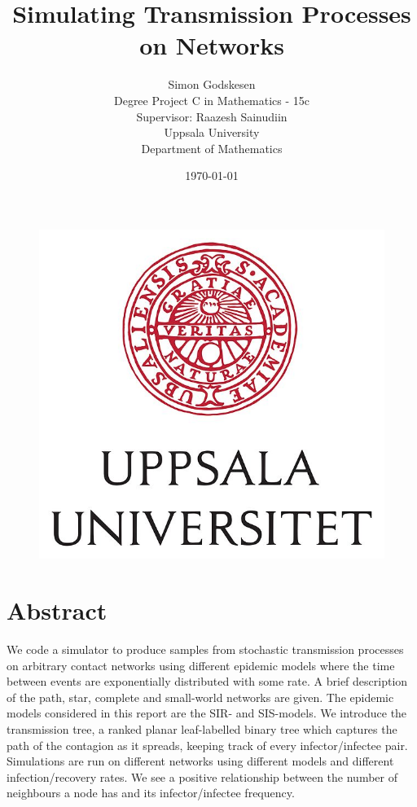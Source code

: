\documentclass[12pt]{article} %
\numberwithin{equation}{section}
\begin{document}
\title{Simulating Transmission Processes on Networks}
\author{Simon Godskesen\\Degree Project C in Mathematics - 15c\\Supervisor: Raazesh Sainudiin\\ Uppsala University\\Department of Mathematics}
\date{\today} %
\maketitle
\begin{figure}[ht]
    \centering
    \includegraphics[scale=0.3]{UU_logo.png}    
\end{figure}
\FloatBarrier
\thispagestyle{empty}
\newpage

\thispagestyle{empty}

\section*{Abstract}
We code a simulator to produce samples from stochastic transmission processes on arbitrary contact networks using different epidemic models where the time between events are exponentially distributed with some rate. A brief description of the path, star, complete and small-world networks are given. The epidemic models considered in this report are the SIR- and SIS-models. We introduce the transmission tree, a ranked planar leaf-labelled binary tree which captures the path of the contagion as it spreads, keeping track of every infector/infectee pair. Simulations are run on different networks using different models and different infection/recovery rates. We see a positive relationship between the number of neighbours a node has and its infector/infectee frequency.
\end{document}

